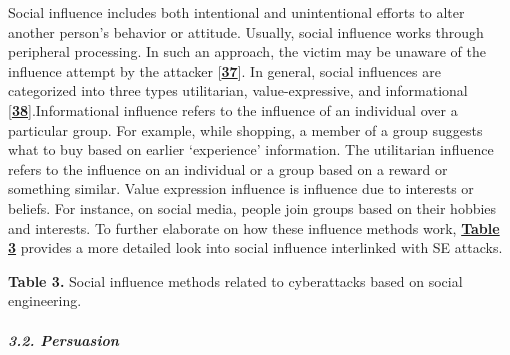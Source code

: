 Social influence includes both intentional and unintentional efforts to alter another person’s behavior or attitude. Usually, social influence works through peripheral processing. In such an approach, the victim may be unaware of the influence attempt by the attacker [\href{https://www.mdpi.com/2076-3417/12/12/6042\#B37-applsci-12-06042}{\textbf{37}}]. In general, social influences are categorized into three types utilitarian, value-expressive, and informational [\href{https://www.mdpi.com/2076-3417/12/12/6042\#B38-applsci-12-06042}{\textbf{38}}].Informational influence refers to the influence of an individual over a particular group. For example, while shopping, a member of a group suggests what to buy based on earlier ‘experience’ information. The utilitarian influence refers to the influence on an individual or a group based on a reward or something similar. Value expression influence is influence due to interests or beliefs. For instance, on social media, people join groups based on their hobbies and interests. To further elaborate on how these influence methods work, \href{https://www.mdpi.com/2076-3417/12/12/6042\#table_body_display_applsci-12-06042-t003}{\textbf{Table 3}} provides a more detailed look into social influence interlinked with SE attacks.

\textbf{Table 3.} Social influence methods related to cyberattacks based on social engineering.



 
\paragraph{\textit{3.2. Persuasion}}

